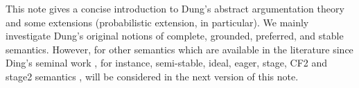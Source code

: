 This note gives a concise introduction to Dung's abstract argumentation theory \cite{Dun1995} and  some extensions (probabilistic extension, in particular).
% 
We mainly investigate Dung's original notions of complete, grounded, preferred, and stable semantics. 
However, 
for other semantics which are available in the literature since Ding's seminal work \cite{Dun1995}, 
for instance, 
semi-stable, ideal, eager, stage, CF2 and stage2 semantics \cite{Bar.Gia2009, Bar.Cam.Gia2018}, 
will be considered in the next version of this note.




\tableofcontents
